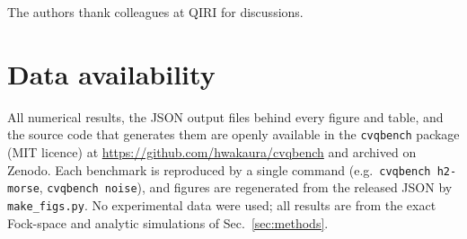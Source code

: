\documentclass[aps,pra,reprint,superscriptaddress,nofootinbib]{revtex4-2}
\begin{document}
\begin{acknowledgments}
The authors thank colleagues at QIRI for discussions.
\end{acknowledgments}

\section*{Data availability}
All numerical results, the JSON output files behind every figure and table,
and the source code that generates them are openly available in the
\texttt{cvqbench} package (MIT licence) at
\url{https://github.com/hwakaura/cvqbench} and archived on Zenodo. Each
benchmark is reproduced by a single command (e.g.\ \texttt{cvqbench h2-morse},
\texttt{cvqbench noise}), and figures are regenerated from the released JSON
by \texttt{make\_figs.py}. No experimental data were used; all results are
from the exact Fock-space and analytic simulations of Sec.~\ref{sec:methods}.
\end{document}
